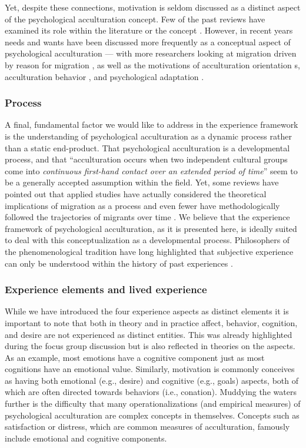 \documentclass[man, 12pt, a4paper]{apa7}
\begin{document}
Yet, despite these connections, motivation is seldom discussed as a distinct aspect of the psychological acculturation concept. Few of the past reviews have examined its role within the literature or the concept \citep[including, ][]{Ward2001a, Ward2019}. However, in recent years needs and wants have been discussed more frequently as a conceptual aspect of psychological acculturation --- with more researchers looking at migration driven by reason for migration \citep{Sandu2018}, as well as the motivations of acculturation orientation s\citep{Recker2017a}, acculturation behavior \citep{Reece2000}, and psychological adaptation \citep{Safdar2003}. 

\subsubsection{Process}
A final, fundamental factor we would like to address in the experience framework is the understanding of psychological acculturation as a dynamic process rather than a static end-product. That psychological acculturation is a developmental process, and that ``acculturation occurs when two independent cultural groups come into \textit{continuous first-hand contact over an extended period of time}'' \citep[][186]{Berry1989} seem to be a generally accepted assumption within the field. Yet, some reviews have pointed out that applied studies have actually considered the theoretical implications of migration as a process and even fewer have methodologically followed the trajectories of migrants over time \citep[e.g.,][]{Brown2011, Ward2019}. We believe that the experience framework of psychological acculturation, as it is presented here, is ideally suited to deal with this conceptualization as a developmental process. Philosophers of the phenomenological tradition have long highlighted that subjective experience can only be understood within the history of past experiences \citep[e.g.,][]{Heidegger1867}. 

\subsubsection{Experience elements and lived experience}
While we have introduced the four experience aspects as distinct elements it is important to note that both in theory and in practice affect, behavior, cognition, and desire are not experienced as distinct entities. This was already highlighted during the focus group discussion but is also reflected in theories on the aspects. As an example, most emotions have a cognitive component just as most cognitions have an emotional value. Similarly, motivation is commonly conceives as having both emotional (e.g., desire) and cognitive (e.g., goals) aspects, both of which are often directed towards behaviors (i.e., conation). Muddying the waters further is the difficulty that many operationalizations (and empirical measures) of psychological acculturation are complex concepts in themselves. Concepts such as satisfaction or distress, which are common measures of acculturation, famously include emotional and cognitive components. 
\end{document}
